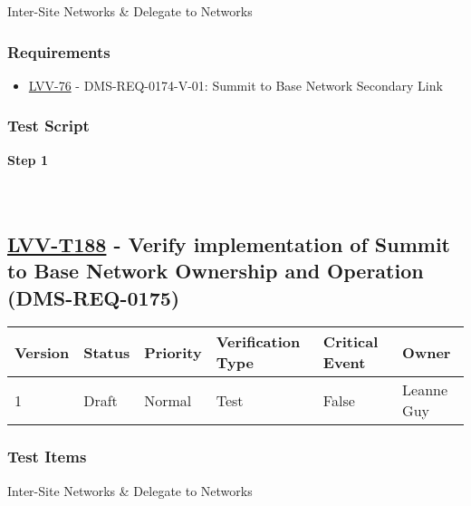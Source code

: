 Inter-Site Networks \& Delegate to Networks

\hypertarget{requirements-164}{%
\subsubsection{Requirements}\label{requirements-164}}

\begin{itemize}
\tightlist
\item
  \href{https://jira.lsstcorp.org/browse/LVV-76}{LVV-76} -
  DMS-REQ-0174-V-01: Summit to Base Network Secondary Link
\end{itemize}

\hypertarget{test-script-164}{%
\subsubsection{Test Script}\label{test-script-164}}

\textbf{Step 1}\\
~\\
~\\

\hypertarget{lvv-t188---verify-implementation-of-summit-to-base-network-ownership-and-operation-dms-req-0175}{%
\subsection{\texorpdfstring{\href{https://jira.lsstcorp.org/secure/Tests.jspa\#/testCase/LVV-T188}{LVV-T188}
- Verify implementation of Summit to Base Network Ownership and
Operation
(DMS-REQ-0175)}{LVV-T188 - Verify implementation of Summit to Base Network Ownership and Operation (DMS-REQ-0175)}}\label{lvv-t188---verify-implementation-of-summit-to-base-network-ownership-and-operation-dms-req-0175}}

\begin{longtable}[]{@{}llllll@{}}
\toprule
Version & Status & Priority & Verification Type & Critical Event &
Owner\tabularnewline
\midrule
\endhead
1 & Draft & Normal & Test & False & Leanne Guy\tabularnewline
\bottomrule
\end{longtable}

\hypertarget{test-items-164}{%
\subsubsection{Test Items}\label{test-items-164}}

Inter-Site Networks \& Delegate to Networks

